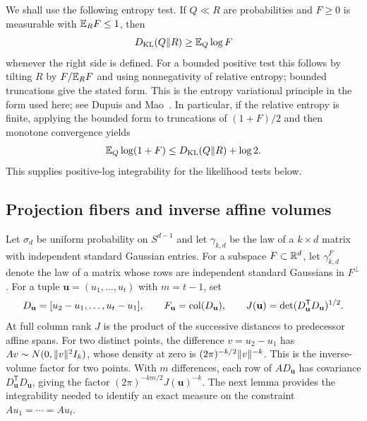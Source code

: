 We shall use the following entropy test. If $Q\ll R$ are probabilities and
$F\ge0$ is measurable with $\mathbb E_R F\le1$, then
\begin{equation}\label{eq:entropy-test}
 D_{\mathrm{KL}}(Q\Vert R)\ge\mathbb E_Q\log F
\end{equation}
whenever the right side is defined. For a bounded positive test this follows
by tilting $R$ by $F/\mathbb E_R F$ and using nonnegativity of relative entropy;
bounded truncations give the stated form. This is the entropy variational
principle in the form used here; see
Dupuis and Mao~\cite[Equations (1.1)--(1.2)]{DupuisMao2022}.
In particular, if the relative entropy is finite, applying the bounded form
to truncations of $(1+F)/2$ and then monotone convergence yields
\begin{equation}\label{eq:entropy-positive-log}
 \mathbb E_Q\log(1+F)\le D_{\mathrm{KL}}(Q\Vert R)+\log2.
\end{equation}
This supplies positive-log integrability for the likelihood tests below.

\subsection{Projection fibers and inverse affine volumes}

Let $\sigma_d$ be uniform probability on $S^{d-1}$ and let $\gamma_{k,d}$
be the law of a $k\times d$ matrix with independent standard Gaussian
entries. For a subspace $F\subset\mathbb R^d$, let $\gamma_{k,d}^{F}$ denote the
law of a matrix whose rows are independent standard Gaussians in $F^\perp$.
For a tuple $\mathbf u=(u_1,\ldots,u_t)$ with $m=t-1$, set
\begin{equation}\label{eq:equal-label-geometry}
 D_{\mathbf u}=[u_2-u_1,\ldots,u_t-u_1],\qquad
 F_{\mathbf u}=\operatorname{col}(D_{\mathbf u}),\qquad
 J(\mathbf u)=\det(D_{\mathbf u}^{\mathsf T}D_{\mathbf u})^{1/2}.
\end{equation}
At full column rank $J$ is the product of the successive distances to
predecessor affine spans. For two distinct points, the difference
$v=u_2-u_1$ has $Av\sim N(0,\lVert v\rVert^2I_k)$, whose density at zero is
$(2\pi)^{-k/2}\lVert v\rVert^{-k}$. This is the inverse-volume factor for two
points. With $m$ differences, each row of $AD_{\mathbf u}$ has covariance
$D_{\mathbf u}^{\mathsf T}D_{\mathbf u}$, giving the factor
$(2\pi)^{-km/2}J(\mathbf u)^{-k}$. The next lemma provides the integrability
needed to identify an exact measure on the constraint $Au_1=\cdots=Au_t$.

